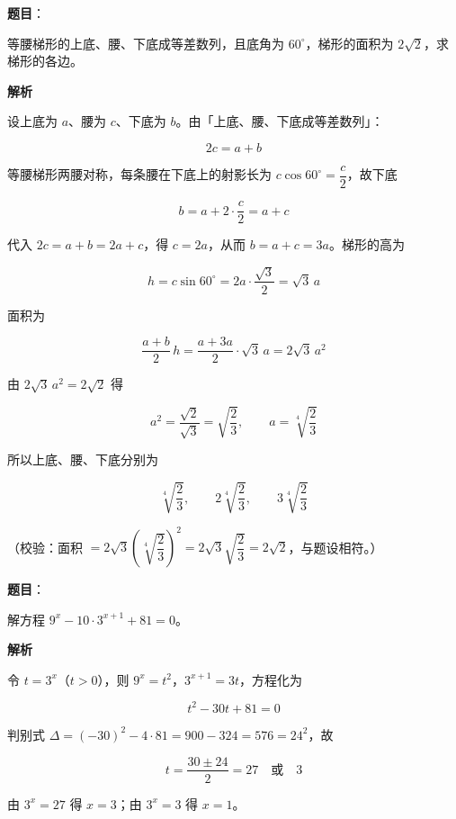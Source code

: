 \begin{answer}

\textbf{题目}：

等腰梯形的上底、腰、下底成等差数列，且底角为 $60^\circ$，梯形的面积为 $2\sqrt2$，求梯形的各边。

\textbf{解析}

设上底为 $a$、腰为 $c$、下底为 $b$。由「上底、腰、下底成等差数列」：

\nopagebreak[4]
\[
2c=a+b
\]

等腰梯形两腰对称，每条腰在下底上的射影长为 $c\cos 60^\circ=\dfrac c2$，故下底

\nopagebreak[4]
\[
b=a+2\cdot\frac c2=a+c
\]

代入 $2c=a+b=2a+c$，得 $c=2a$，从而 $b=a+c=3a$。梯形的高为

\nopagebreak[4]
\[
h=c\sin 60^\circ=2a\cdot\frac{\sqrt3}{2}=\sqrt3\,a
\]

面积为

\nopagebreak[4]
\[
\frac{a+b}{2}\,h=\frac{a+3a}{2}\cdot\sqrt3\,a=2\sqrt3\,a^2
\]

由 $2\sqrt3\,a^2=2\sqrt2$ 得

\nopagebreak[4]
\[
a^2=\frac{\sqrt2}{\sqrt3}=\sqrt{\frac23},
\qquad
a=\sqrt[4]{\frac23}
\]

所以上底、腰、下底分别为

\nopagebreak[4]
\[
\sqrt[4]{\frac23},\qquad
2\sqrt[4]{\frac23},\qquad
3\sqrt[4]{\frac23}
\]

（校验：面积 $=2\sqrt3\left(\sqrt[4]{\dfrac23}\right)^2=2\sqrt3\sqrt{\dfrac23}=2\sqrt2$，与题设相符。）


\end{answer}
\begin{answer}

\textbf{题目}：

解方程 $9^x-10\cdot 3^{x+1}+81=0$。

\textbf{解析}

令 $t=3^x$（$t>0$），则 $9^x=t^2$，$3^{x+1}=3t$，方程化为

\nopagebreak[4]
\[
t^2-30t+81=0
\]

判别式 $\Delta=(-30)^2-4\cdot 81=900-324=576=24^2$，故

\nopagebreak[4]
\[
t=\frac{30\pm 24}{2}=27\quad\text{或}\quad 3
\]

由 $3^x=27$ 得 $x=3$；由 $3^x=3$ 得 $x=1$。


\end{answer}
